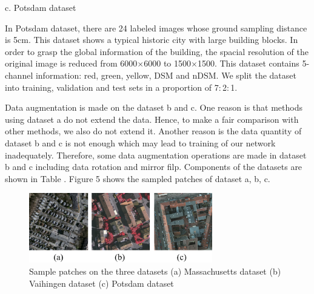 \setlength{\parindent}{2ex}c. Potsdam dataset\par
\setlength{\parindent}{4ex}In Potsdam dataset, there are 24 labeled images whose ground sampling distance is 5cm. This dataset shows a typical historic city with large building blocks. In order to grasp the global information of the building, the spacial resolution of the original image is reduced from 6000$\times$6000 to 1500$\times$1500. This dataset contains 5-channel information: red, green, yellow, DSM and nDSM. We split the dataset into training, validation and test sets in a proportion of 7${:}$2${:}$1.\par
Data augmentation is made on the dataset b and c. One reason is that methods using dataset a do not extend the data. Hence, to make a fair comparison with other methods, we also do not extend it. Another reason is the data quantity of dataset b and c is not enough which may lead to training of our network inadequately. Therefore, some data augmentation operations are made in dataset b and c including data rotation and mirror filp. Components of the datasets are shown in Table . Figure 5 shows the sampled patches of dataset a, b, c.\par
\begin{figure}
\centering
\includegraphics[width=8cm]{Figures/datasets.eps}
\caption{Sample patches on the three datasets  (a) Massachusetts dataset (b) Vaihingen dataset (c) Potsdam dataset}
\label{5}
\end{figure}
